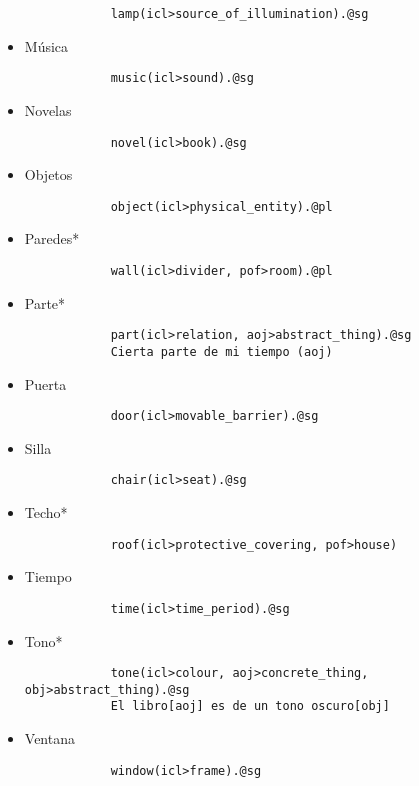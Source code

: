 \documentclass{article}
\begin{document}
\begin{itemize}
\begin{verbatim}
            lamp(icl>source_of_illumination).@sg
        \end{verbatim}
        \item Música
        \begin{verbatim}
            music(icl>sound).@sg
        \end{verbatim}
        \item Novelas
        \begin{verbatim}
            novel(icl>book).@sg
        \end{verbatim}
        \item Objetos
        \begin{verbatim}
            object(icl>physical_entity).@pl
        \end{verbatim}
        \item Paredes*
        \begin{verbatim}
            wall(icl>divider, pof>room).@pl
        \end{verbatim}
        \item Parte*
        \begin{verbatim}
            part(icl>relation, aoj>abstract_thing).@sg
            Cierta parte de mi tiempo (aoj)
        \end{verbatim}
        \item Puerta
        \begin{verbatim}
            door(icl>movable_barrier).@sg
        \end{verbatim}
        \item Silla
        \begin{verbatim}
            chair(icl>seat).@sg
        \end{verbatim}
        \item Techo*
        \begin{verbatim}
            roof(icl>protective_covering, pof>house)
        \end{verbatim}
        \item Tiempo
        \begin{verbatim}
            time(icl>time_period).@sg
        \end{verbatim}
        \item Tono*
        \begin{verbatim}
            tone(icl>colour, aoj>concrete_thing, obj>abstract_thing).@sg
            El libro[aoj] es de un tono oscuro[obj] 
        \end{verbatim}
        \item Ventana
        \begin{verbatim}
            window(icl>frame).@sg
        \end{verbatim}
    \end{itemize}
\end{document}
